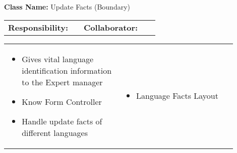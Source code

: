\begin{cards}[]
    \textbf{Class Name:} Update Facts (Boundary)
    \tcbline
    \begin{tabular}{p{0.45\linewidth} | p{0.45\linewidth}}
        \textbf{Responsibility:}& 
        \textbf{Collaborator:}\\
    \end{tabular}
    \tcbline
    \begin{tabular}{p{0.45\linewidth} | p{0.45\linewidth}}
        \begin{itemize}
            \item Gives vital language identification information to the Expert manager
            \item Know Form Controller
            \item Handle update facts of different languages
        \end{itemize}
        &
        \begin{itemize}
            \item Language Facts Layout
        \end{itemize}
    \end{tabular}
\end{cards}